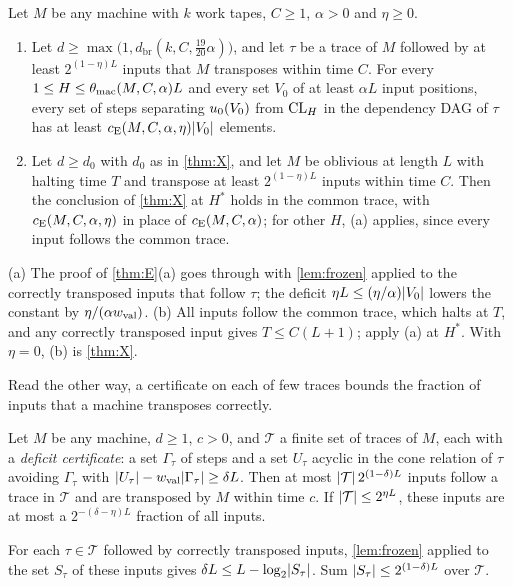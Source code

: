 \begin{corollary}\label{cor:approx}
Let $M$ be any machine with $k$ work tapes, $C\ge1$, $\alpha>0$ and $\eta\ge0$.
\begin{enumerate}[label=(\alph*)]
\item Let $d\ge\max\bigl(1,d_{\mathrm{br}}(k,C,\tfrac{19}{20}\alpha)\bigr)$, and let $\tau$ be a trace of $M$ followed by at least
$2^{(1-\eta)L}$ inputs that $M$ transposes within time $C$. For every $1\le H\le\theta_{\mathrm{mac}}(M,C,\alpha)L$ and every set $V_0$ of at least
$\alpha L$ input positions, every set of steps separating $u_0(V_0)$ from $\mathrm{CL}_H$ in the dependency DAG of $\tau$ has at least
$c_{\mathrm{E}}(M,C,\alpha,\eta)\lvert V_0 \rvert$ elements.
\item Let $d\ge d_0$ with $d_0$ as in \cref{thm:X}, and let $M$ be oblivious at length $L$ with halting time $T$ and transpose at least
$2^{(1-\eta)L}$ inputs within time $C$. Then the conclusion of \cref{thm:X} at $H^*$ holds in the common trace, with $c_{\mathrm{E}}(M,C,\alpha,\eta)$
in place of $c_{\mathrm{E}}(M,C,\alpha)$; for other $H$, (a) applies, since every input follows the common trace.
\end{enumerate}
\end{corollary}

\begin{outline}
(a) The proof of \cref{thm:E}(a) goes through with \cref{lem:frozen} applied to the correctly transposed inputs that follow $\tau$; the
deficit $\eta L\le(\eta/\alpha)\lvert V_0 \rvert$ lowers the constant by $\eta/(\alpha w_{\mathrm{val}})$. (b) All inputs follow the common trace, which halts
at $T$, and any correctly transposed input gives $T\le C(L+1)$; apply (a) at $H^*$. With $\eta=0$, (b) is \cref{thm:X}.
\end{outline}

Read the other way, a certificate on each of few traces bounds the fraction of inputs that a machine transposes correctly.

\begin{corollary}\label{cor:frozen-count}
Let $M$ be any machine, $d\ge1$, $c>0$, and $\mathcal T$ a finite set of traces of $M$, each with a \emph{deficit certificate}: a set
$\Gamma_\tau$ of steps and a set $U_\tau$ acyclic in the cone relation of $\tau$ avoiding $\Gamma_\tau$ with
$\lvert U_\tau \rvert-w_{\mathrm{val}}\lvert \Gamma_\tau \rvert\ge\delta L$. Then at most $\lvert \mathcal T \rvert\,2^{(1-\delta)L}$ inputs follow a trace in $\mathcal T$
and are transposed by $M$ within time $c$. If $\lvert \mathcal T \rvert\le2^{\eta L}$, these inputs are at most a $2^{-(\delta-\eta)L}$ fraction of
all inputs.
\end{corollary}

\begin{outline}
For each $\tau\in\mathcal T$ followed by correctly transposed inputs, \cref{lem:frozen} applied to the set $S_\tau$ of these inputs gives
$\delta L\le L-\log_2\lvert S_\tau \rvert$. Sum $\lvert S_\tau \rvert\le2^{(1-\delta)L}$ over $\mathcal T$.
\end{outline}
